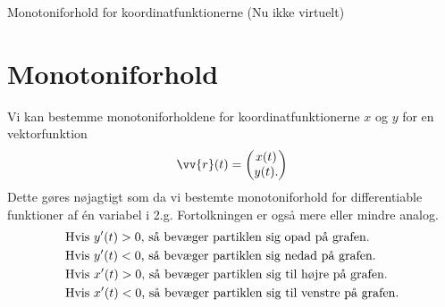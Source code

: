 \begin{center}
	\Huge
	Monotoniforhold for koordinatfunktionerne (Nu ikke virtuelt)
\end{center}
\section*{Monotoniforhold}

Vi kan bestemme monotoniforholdene for koordinatfunktionerne $x$ og $y$ for en vektorfunktion
\begin{align*}
	\vv{r}(t) = 
	\begin{pmatrix}
		x(t) \\
		y(t).
	\end{pmatrix}
\end{align*}
Dette gøres nøjagtigt som da vi bestemte monotoniforhold for differentiable funktioner af én variabel i 2.g. Fortolkningen er også mere eller mindre analog. 
\begin{align*}
	&\textnormal{Hvis $y'(t)>0$, så bevæger partiklen sig opad på grafen.}\\
	&\textnormal{Hvis $y'(t)<0$, så bevæger partiklen sig nedad på grafen.}\\
	&\textnormal{Hvis $x'(t)>0$, så bevæger partiklen sig til højre på grafen.}\\
	&\textnormal{Hvis $x'(t)<0$, så bevæger partiklen sig til venstre på grafen.}\\
\end{align*}


